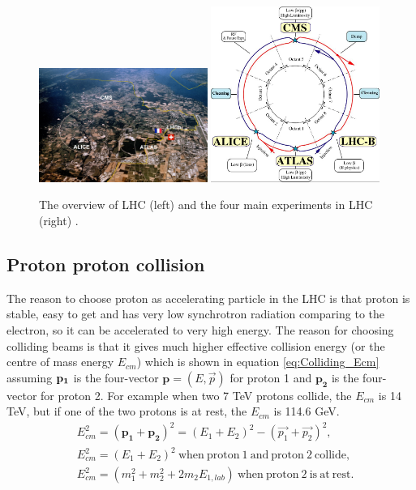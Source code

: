 \begin{figure}[h!]
\begin{center}
\includegraphics[width=0.49\textwidth]{figures/LHC/LHC.jpeg}
\includegraphics[width=0.49\textwidth]{figures/LHC/LHC2.jpg}
\caption{The overview of LHC (left) and the four main experiments in LHC (right) \cite{LHC_FourExp}.}
\label{fig:LHC}
\end{center}
\end{figure}

\subsection{Proton proton collision}\label{sec:LHC_pp_collision}
The reason to choose proton as accelerating particle in the LHC is that proton is stable, easy to get and has very low synchrotron radiation comparing to the electron, so it can be accelerated to very high energy. The reason for choosing colliding beams is that it gives much higher effective collision energy (or the centre of mass energy $E_{cm}$) which is shown in equation \ref{eq:Colliding_Ecm} assuming $\bf{p_{1}}$ is the four-vector $\mathbf{p}=(E,\overrightarrow{p})$ for proton 1 and $\mathbf{p_{2}}$ is the four-vector for proton 2. For example when two 7 TeV protons collide, the $E_{cm}$ is 14 TeV, but if one of the two protons is at rest, the $E_{cm}$ is 114.6 GeV.
\begin{equation}
\begin{split}
&E_{cm}^{2}=(\mathbf{p_{1}}+\mathbf{p_{2}})^{2}=(E_{1}+E_{2})^{2}-(\overrightarrow{p_{1}}+\overrightarrow{p_{2}})^{2}, \\
&E_{cm}^{2}=(E_{1}+E_{2})^{2} \mathrm{~when~proton~1~and~proton~2~collide},                                  \\
&E_{cm}^{2}=(m_{1}^{2}+m_{2}^{2}+2m_{2}E_{1,lab}) \mathrm{~when~proton~2~is~at~rest}.                          \\
\end{split}
\label{eq:Colliding_Ecm}
\end{equation}

